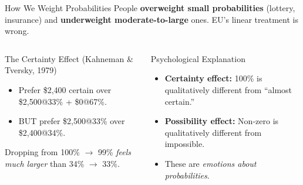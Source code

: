 \documentclass[aspectratio=169]{beamer}
\begin{document}
\begin{frame}{How We Weight Probabilities}
People \textbf{overweight small probabilities} (lottery, insurance) and \textbf{underweight moderate-to-large} ones. EU's linear treatment is wrong.
\begin{columns}
\begin{exampleblock}{The Certainty Effect (Kahneman \& Tversky, 1979)}
\begin{itemize}
  \item Prefer \$2,400 certain over \$2,500@33\% + \$0@67\%.
  \item BUT prefer \$2,500@33\% over \$2,400@34\%.
\end{itemize}
Dropping from 100\% $\to$ 99\% \textit{feels much larger} than 34\% $\to$ 33\%.
\end{exampleblock}
\begin{alertblock}{Psychological Explanation}
\begin{itemize}
  \item \textbf{Certainty effect:} 100\% is qualitatively different from ``almost certain.''
  \item \textbf{Possibility effect:} Non-zero is qualitatively different from impossible.
  \item These are \textit{emotions about probabilities}.
\end{itemize}
\end{alertblock}
\end{columns}
\end{frame}
\end{document}
